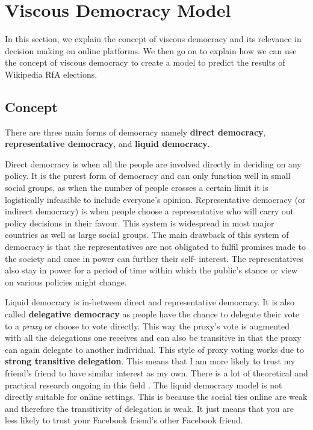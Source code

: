 \section{Viscous Democracy Model}
\label{sec:model}
In this section, we explain the concept of viscous democracy \cite{ViscousDemocracy} and its relevance in decision making on online platforms. We then go on to explain how we can use the concept of viscous democracy to create a model to predict the results of Wikipedia RfA elections.

\subsection{Concept}
There are three main forms of democracy namely \textbf{direct democracy}, \textbf{representative democracy}, and \textbf{liquid democracy}.

Direct democracy is when all the people are involved directly in deciding on any policy. It is the purest form of democracy and can only function well in small social groups, as when the number of people crosses a certain limit it is logistically infeasible to include everyone's opinion. Representative democracy (or indirect democracy) is when people choose a representative who will carry out policy decisions in their favour. This system is widespread in most major countries as well as large social groups. The main drawback of this system of democracy is that the representatives are not obligated to fulfil promises made to the society and once in power can further their self-  interest. The representatives also stay in power for a period of time within which the public's stance or view on various policies might change.

Liquid democracy is in-between direct and representative democracy. It is also called \textbf{delegative democracy} as people have the chance to delegate their vote to a \textit{proxy} or choose to vote directly. This way the proxy's vote is augmented with all the delegations one receives and can also be transitive in that the proxy can again delegate to another individual. This style of proxy voting works due to \textbf{strong transitive delegation}. This means that I am more likely to trust my friend's friend to have similar interest as my own. There is a lot of theoretical and practical research ongoing in this field \cite{kahng2018liquid,hardt2015google}. The liquid democracy model is not directly suitable for online settings. This is because the social ties online are weak and therefore the transitivity of delegation is weak. It just means that you are less likely to trust your Facebook friend's other Facebook friend. 

